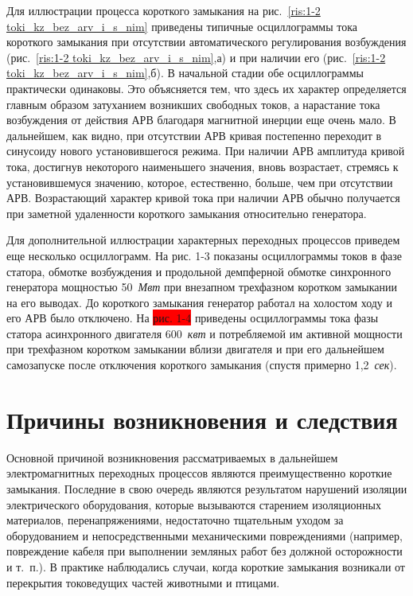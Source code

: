 Для иллюстрации процесса короткого замыкания на рис.~\ref{ris:1-2 toki_kz_bez_arv_i_s_nim} приведены типичные осциллограммы тока короткого замыкания при отсутствии автоматического регулирования возбуждения (рис.~\ref{ris:1-2 toki_kz_bez_arv_i_s_nim},а) и при наличии его (рис.~\ref{ris:1-2 toki_kz_bez_arv_i_s_nim},б). В начальной стадии обе осциллограммы практически одинаковы. Это объясняется тем, что здесь их характер определяется главным образом затуханием возникших свободных токов, а нарастание тока возбуждения от действия АРВ благодаря магнитной инерции еще очень мало. В дальнейшем, как видно, при отсутствии АРВ кривая постепенно переходит в синусоиду нового установившегося режима. При наличии АРВ амплитуда кривой тока, достигнув некоторого наименьшего значения, вновь возрастает, стремясь к установившемуся значению, которое, естественно, больше, чем при отсутствии АРВ. Возрастающий характер кривой тока при наличии АРВ обычно получается при заметной удаленности короткого замыкания относительно генератора.

Для дополнительной иллюстрации характерных переходных процессов приведем еще несколько осциллограмм. На рис. 1-3 показаны осциллограммы токов в фазе статора, обмотке возбуждения и продольной демпферной обмотке синхронного генератора мощностью 50~\textit{Мвт} при внезапном трехфазном коротком замыкании на его выводах. До короткого замыкания генератор работал на холостом ходу и его АРВ было отключено. На \colorbox{red}{рис. 1-4} приведены осциллограммы тока фазы статора асинхронного двигателя 600~\textit{квт} и потребляемой им активной мощности при трехфазном коротком замыкании вблизи двигателя и при его дальнейшем самозапуске после отключения короткого замыкания (спустя примерно 1,2~\textit{сек}).

\section{Причины возникновения и следствия}
\label{sec:1-2 prichiny_vozniknoveniia_i_sledstviia}

Основной причиной возникновения рассматриваемых в дальнейшем электромагнитных переходных процессов являются преимущественно короткие замыкания. Последние в свою очередь являются результатом нарушений изоляции электрического оборудования, которые вызываются старением изоляционных материалов, перенапряжениями, недостаточно тщательным уходом за оборудованием и непосредственными механическими повреждениями (например, повреждение кабеля при выполнении земляных работ без должной осторожности и т.~п.). В практике наблюдались случаи, когда короткие замыкания возникали от перекрытия токоведущих частей животными и птицами.

